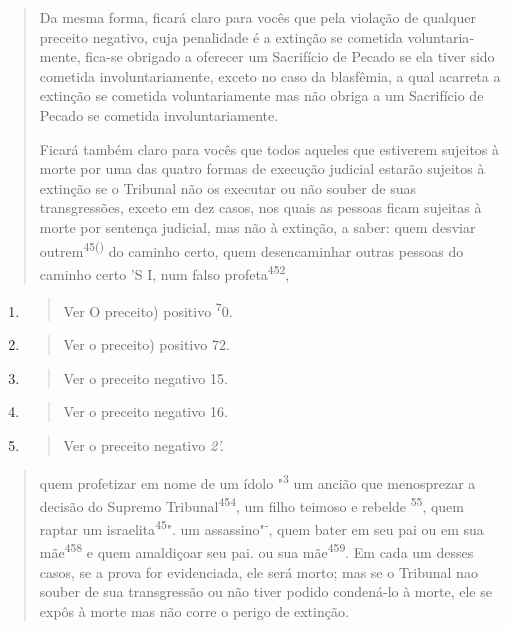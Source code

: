 \begin{quote}
Da mesma forma, ficará claro para vocês que pela violação de qual­quer
preceito negativo, cuja penalidade é a extinção se cometida
voluntaria­mente, fica-se obrigado a oferecer um Sacrifício de Pecado se
ela tiver sido co­metida involuntariamente, exceto no caso da blasfêmia,
a qual acarreta a extin­ção se cometida voluntariamente mas não obriga a
um Sacrifício de Pecado se cometida involuntariamente.

Ficará também claro para vocês que todos aqueles que estiverem su­jeitos
à morte por uma das quatro formas de execução judicial estarão sujeitos
à extinção se o Tribunal não os executar ou não souber de suas
transgressões, exceto em dez casos, nos quais as pessoas ficam sujeitas
à morte por sentença judicial, mas não à extinção, a saber: quem desviar
outrem\textsuperscript{45()} do caminho certo, quem desencaminhar outras
pessoas do caminho certo 'S I, num falso profeta\textsuperscript{452},
\end{quote}

\begin{enumerate}
\def\labelenumi{\arabic{enumi}.}
\setcounter{enumi}{447}
\item
  \begin{quote}
  Ver O preceito) positivo \textsuperscript{7}0.
  \end{quote}
\item
  \begin{quote}
  Ver o preceito) positivo 72.
  \end{quote}
\item
  \begin{quote}
  Ver o preceito negativo 15.
  \end{quote}
\item
  \begin{quote}
  Ver o preceito negativo 16.
  \end{quote}
\item
  \begin{quote}
  Ver o preceito negativo \emph{2'.}
  \end{quote}
\end{enumerate}

\begin{quote}quem profetizar em nome de um ídolo 
"\textsuperscript{3} um ancião que
menosprezar a deci­são do Supremo Tribunal\textsuperscript{454}, um
filho teimoso e rebelde \textsuperscript{55}, quem raptar um
israelita\textsuperscript{45}". um assassino"\textsuperscript{-}, quem
bater em seu pai ou em sua mãe\textsuperscript{458} e quem amaldiçoar
seu pai. ou sua mãe\textsuperscript{459}. Em cada um desses casos, se a
prova for evi­denciada, ele será morto; mas se o Tribunal nao souber de
sua transgressão ou não tiver podido condená-lo à morte, ele se expôs à
morte mas não corre o perigo de extinção.
\end{quote}

